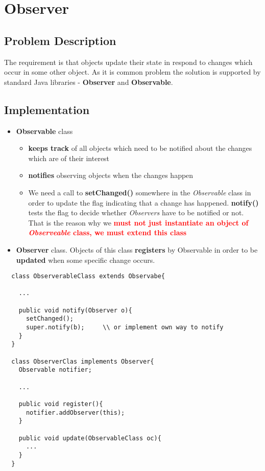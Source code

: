\documentclass{report}
\begin{document}
\chapter{Observer}


\section{Problem Description}
The requirement is that objects update their state in respond to changes which occur in some other object. As it is common problem
the solution is supported by standard Java libraries - \textbf{Observer} and \textbf{Observable}.


\section{Implementation}
\begin{itemize}
	\item \textbf{Observable} class 
	\begin{itemize}
		\item \textbf{keeps track} of all objects which need to be notified about the changes which are of their interest
		\item \textbf{notifies} observing objects when the changes happen
		\item We need a call to \textbf{setChanged()} somewhere in the \textit{Observable} class in order to update the flag indicating that a change has happened.
		\textbf{notify()} tests the flag to decide whether \textit{Observers} have to be notified or not. That is the reason why we \textbf{\textcolor{red}{must not just instantiate an object of \textit{Observeable} class, we must extend this class}}
	\end{itemize}

	\item \textbf{Observer} class. Objects of this class \textbf{registers} by Observable in order to be \textbf{updated}
	when some specific change occurs.
\end{itemize}

\begin{verbatim}
  class ObserverableClass extends Observabe{
    
    ...
    
    public void notify(Observer o){
      setChanged();
      super.notify(b);     \\ or implement own way to notify
    }
  }
  
  class ObserverClas implements Observer{
    Observable notifier;
    
    ...
    
    public void register(){
      notifier.addObserver(this);
    }
    
    public void update(ObservableClass oc){
      ...
    }
  }
\end{verbatim}
\end{document}
